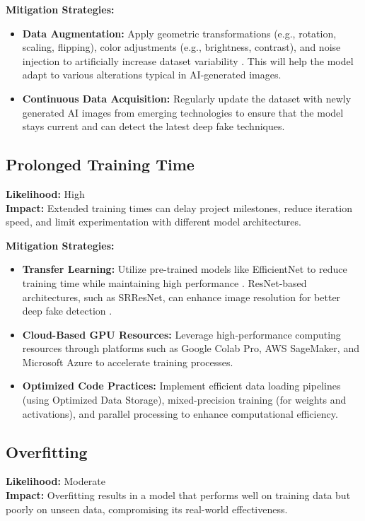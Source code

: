 \documentclass{article} %
\begin{document}
\textbf{Mitigation Strategies:}
\begin{itemize}
    \item \textbf{Data Augmentation:} Apply geometric transformations (e.g., rotation, scaling, flipping), color adjustments (e.g., brightness, contrast), and noise injection to artificially increase dataset variability \citep{shorten2019}. This will help the model adapt to various alterations typical in AI-generated images.
    \item \textbf{Continuous Data Acquisition:} Regularly update the dataset with newly generated AI images from emerging technologies to ensure that the model stays current and can detect the latest deep fake techniques.
\end{itemize}

\subsection{Prolonged Training Time}
\textbf{Likelihood:} High \\
\textbf{Impact:} Extended training times can delay project milestones, reduce iteration speed, and limit experimentation with different model architectures.

\textbf{Mitigation Strategies:}
\begin{itemize}
    \item \textbf{Transfer Learning:} Utilize pre-trained models like EfficientNet to reduce training time while maintaining high performance \citep{tan2019}. ResNet-based architectures, such as SRResNet, can enhance image resolution for better deep fake detection \citep{ledig2017}.
    \item \textbf{Cloud-Based GPU Resources:} Leverage high-performance computing resources through platforms such as Google Colab Pro, AWS SageMaker, and Microsoft Azure to accelerate training processes.
    \item \textbf{Optimized Code Practices:} Implement efficient data loading pipelines (using Optimized Data Storage), mixed-precision training (for weights and activations), and parallel processing to enhance computational efficiency.
\end{itemize}

\subsection{Overfitting}
\textbf{Likelihood:} Moderate \\
\textbf{Impact:} Overfitting results in a model that performs well on training data but poorly on unseen data, compromising its real-world effectiveness.
\end{document}
